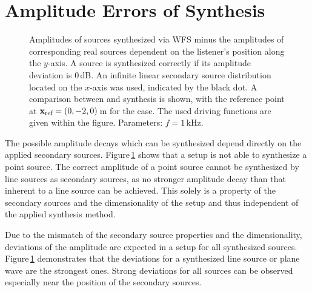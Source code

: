 \section{Amplitude Errors of \twohalfD Synthesis}
\label{sec:amplitude_errors_of_25d_synthesis}
%
\begin{figure}
    \centering
    \small
    
    \caption{Amplitudes of sources synthesized via
    \ac{WFS} minus the amplitudes of corresponding real sources
    dependent on the listener's position along
    the $y$-axis. A source is synthesized correctly if its amplitude
    deviation is $0$\,dB. An infinite linear secondary source distribution
    located on the $x$-axis was used, indicated by the black dot.
    A comparison between \twoD and \twohalfD
    synthesis is shown, with the reference point at $\mathbf{x}_\text{ref} = (0,-2,0)$\,m
    for the \twohalfD case. The used driving functions are given within the
    figure.
    Parameters: $f=1$\,kHz.
    }
    \label{fig:amplitudes}
\end{figure}
%
\noindent The possible amplitude decays which can be synthesized depend directly on the
applied secondary sources. Figure\,\ref{fig:amplitudes} shows that a \twoD setup
is not able to synthesize a point source.
The correct amplitude of a point source cannot be synthesized by line
sources as secondary sources, as no stronger amplitude decay than that inherent
to a line source can be achieved.
This solely is a property of the
secondary sources and the dimensionality of the setup and thus independent of
the applied synthesis method.

Due to the mismatch of the secondary source properties and the dimensionality,
deviations of the amplitude are expected in a \twohalfD setup for all synthesized
sources. Figure\,\ref{fig:amplitudes} demonstrates that the deviations for a
synthesized line source or plane wave are the strong\-est ones.
Strong deviations for all sources can be observed especially near the
position of the secondary sources.

